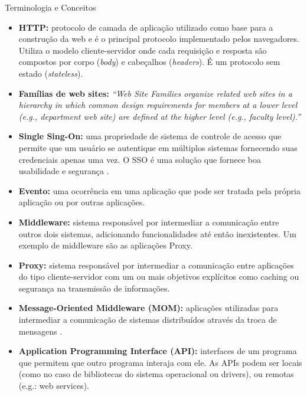 \documentclass{beamer}
\begin{document}
\begin{frame}[allowframebreaks]{Terminologia e Conceitos}
  \begin{itemize}
    \item{
        \textbf{HTTP:} protocolo de camada de aplicação utilizado como base para a construção da web e é o principal protocolo implementado pelos navegadores. Utiliza o modelo cliente-servidor onde cada requisição e resposta são compostos por corpo (\textit{body}) e cabeçalhos (\textit{headers}). É um protocolo sem estado (\textit{stateless}).
    }
    \framebreak
    \item{
       \textbf{Famílias de web sites:} \textit{``Web Site Families organize related web sites in a hierarchy in which common design requirements for members at a lower level (e.g., department web site) are defined at the higher level (e.g., faculty level).''} \cite{Eichinger2009}
    }
    
    \item{
        \textbf{Single Sing-On:} uma propriedade de sistema de controle de acesso que permite que um usuário se autentique em múltiplos sistemas fornecendo suas credenciais apenas uma vez. O SSO é uma solução que fornece boa usabilidade e segurança \cite{Pashalidis2003}.
    }
    
    \framebreak
    \item{
        \textbf{Evento:} uma ocorrência em uma aplicação que pode ser tratada pela própria aplicação ou por outras aplicações.
    }
    
    \item{
        \textbf{Middleware:} sistema responsável por intermediar a comunicação entre outros dois sistemas, adicionando funcionalidades até então inexistentes. Um exemplo de middleware são as aplicações Proxy.
    }
    
    \framebreak
    \item{
        \textbf{Proxy:} sistema responsável por intermediar a comunicação entre aplicações do tipo cliente-servidor com um ou mais objetivos explícitos como caching ou segurança na transmissão de informações.
    }
    
    \item{
        \textbf{Message-Oriented Middleware (MOM):} aplicações utilizadas para intermediar a comunicação de sistemas distribuídos através da troca de mensagens \cite{Vinoski2006}.
    }
    
    \framebreak
    \item{
        \textbf{Application Programming Interface (API):} interfaces de um programa que permitem que outro programa interaja com ele. As APIs podem ser locais (como no caso de bibliotecas do sistema operacional ou drivers), ou remotas (e.g.: web services).
    }
    

\end{itemize}
\end{frame}
\end{document}
